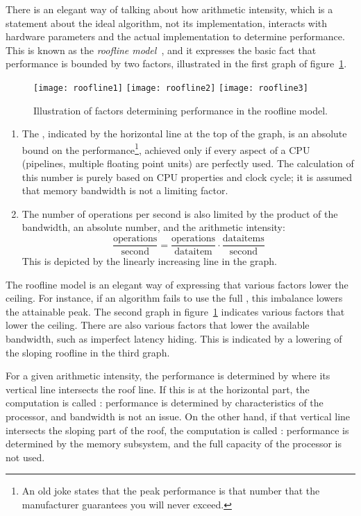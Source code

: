 There is an elegant way of talking about how arithmetic intensity,
which is a statement about the ideal algorithm, not its implementation,
interacts with hardware parameters and the actual implementation
to determine performance.
This is known as the \emph{roofline model}~\cite{Williams:2009:roofline},
and it expresses the basic fact that performance is bounded by two factors,
illustrated in the first graph of figure~\ref{fig:roofline}.
%
\begin{figure}[t]
  \texttt{[image: roofline1]}
  \texttt{[image: roofline2]}
  \texttt{[image: roofline3]}
  \caption{Illustration of factors determining performance in the roofline model.}
  \label{fig:roofline}
\end{figure}
%
\begin{enumerate}
\item The , indicated by the horizontal
  line at the top of the graph, is an absolute bound on the
  performance\footnote
    {An old joke states that the peak performance
    is that number that the manufacturer guarantees you will never
    exceed.}, achieved only if every aspect of a \ac{CPU} (pipelines,
  multiple floating point units) are perfectly used. The calculation
  of this number is purely based on \ac{CPU} properties and clock cycle; it
  is assumed that memory bandwidth is not a limiting factor.
\item The number of operations per second is also limited by the
  product of the bandwidth, an absolute number, and the arithmetic
  intensity:
  \[ \frac{\mathrm{operations}}{\mathrm{second}}=
  \frac{\mathrm{operations}}{\mathrm{data item}}\cdot
  \frac{\mathrm{data items}}{\mathrm{second}}
  \]
  This is depicted by the linearly increasing line in the graph.
\end{enumerate}
The roofline model is an elegant way of expressing that various
factors lower the ceiling.  For instance, if an algorithm fails to use
the full , this imbalance lowers the
attainable peak.  The second graph in figure~\ref{fig:roofline}
indicates various factors that lower the ceiling.
%
There are also various factors that lower the available bandwidth,
such as imperfect latency hiding. This is indicated by a lowering of the 
sloping roofline in the third graph.

For a given arithmetic intensity, the performance is determined by
where its vertical line intersects the roof line. If this is at the
horizontal part, the computation is called :
performance is determined by characteristics of the processor, and
bandwidth is not an issue. On the other hand, if that vertical line
intersects the sloping part of the roof, the computation is called
: performance is determined by the memory
subsystem, and the full capacity of the processor is not used.

